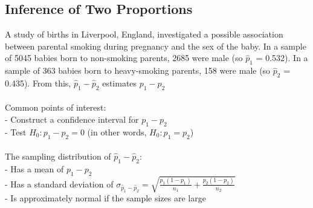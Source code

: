 \documentclass[12pt, a4paper]{article}
\begin{document}
	\subsection{Inference of Two Proportions}
	A study of births in Liverpool, England, investigated a possible association between parental smoking during pregnancy and the sex of the baby. In a sample of 5045 babies born to non-smoking parents, 2685 were male (so $\hat{p}_1$ = 0.532). In a sample of 363 babies born to heavy-smoking parents, 158 were male (so $\hat{p}_2$ = 0.435). From this, $\hat{p}_1 - \hat{p}_2$ estimates $p_1 - p_2$ \\~\\
	Common points of interest: \\
	- Construct a confidence interval for $p_1 - p_2$ \\
	- Test $H_0: p_1 - p_2 = 0$ (in other words, $H_0: p_1 = p_2$) \\~\\
	The sampling distribution of $\hat{p}_1 - \hat{p}_2$: \\
	- Has a mean of $p_1 - p_2$ \\
	- Has a standard deviation of $\sigma_{\hat{p}_1 - \hat{p}_2} = \sqrt{\frac{p_1(1-p_1)}{n_1} + \frac{p_2(1-p_2)}{n_2}}$ \\
	- Is approximately normal if the sample sizes are large \newpage
	
\end{document}
